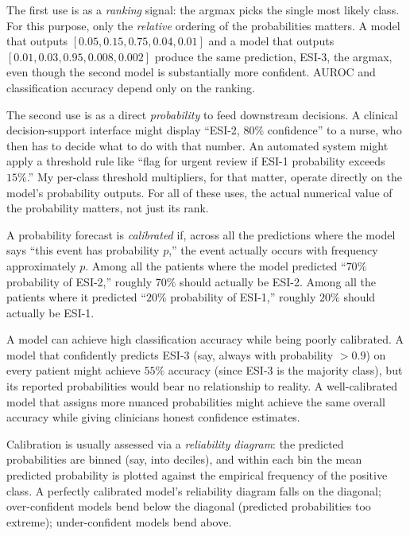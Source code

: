 The first use is as a \emph{ranking} signal: the argmax picks the single most likely class. For this purpose, only the \emph{relative} ordering of the probabilities matters. A model that outputs $[0.05, 0.15, 0.75, 0.04, 0.01]$ and a model that outputs $[0.01, 0.03, 0.95, 0.008, 0.002]$ produce the same prediction, ESI-3, the argmax, even though the second model is substantially more confident. AUROC and classification accuracy depend only on the ranking.

The second use is as a direct \emph{probability} to feed downstream decisions. A clinical decision-support interface might display ``ESI-2, $80\%$ confidence'' to a nurse, who then has to decide what to do with that number. An automated system might apply a threshold rule like ``flag for urgent review if ESI-1 probability exceeds $15\%$.'' My per-class threshold multipliers, for that matter, operate directly on the model's probability outputs. For all of these uses, the actual numerical value of the probability matters, not just its rank.

\begin{notebox}
A probability forecast is \emph{calibrated} if, across all the predictions where the model says ``this event has probability $p$,'' the event actually occurs with frequency approximately $p$. Among all the patients where the model predicted ``$70\%$ probability of ESI-2,'' roughly $70\%$ should actually be ESI-2. Among all the patients where it predicted ``$20\%$ probability of ESI-1,'' roughly $20\%$ should actually be ESI-1.

A model can achieve high classification accuracy while being poorly calibrated. A model that confidently predicts ESI-3 (say, always with probability $>0.9$) on every patient might achieve $55\%$ accuracy (since ESI-3 is the majority class), but its reported probabilities would bear no relationship to reality. A well-calibrated model that assigns more nuanced probabilities might achieve the same overall accuracy while giving clinicians honest confidence estimates.

Calibration is usually assessed via a \emph{reliability diagram}: the predicted probabilities are binned (say, into deciles), and within each bin the mean predicted probability is plotted against the empirical frequency of the positive class. A perfectly calibrated model's reliability diagram falls on the diagonal; over-confident models bend below the diagonal (predicted probabilities too extreme); under-confident models bend above.
\end{notebox}

